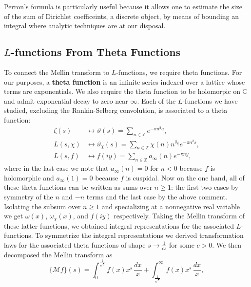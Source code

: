 \documentclass[12pt]{book}
\theoremstyle{definition}\newframedtheorem{method}{Method}
\newcommand{\mc}{\mathcal}
\newcommand{\Z}{\mathbb{Z}}
\newcommand{\C}{\mathbb{C}}
\renewcommand{\d}{\delta}
\newcommand{\z}{\zeta}
\newcommand{\w}{\omega}
\newcommand{\vt}{\vartheta}
\newcommand{\<}{\langle}
\renewcommand{\>}{\rangle}
\begin{document}
      Perron's formula is particularly useful because it allows one to estimate the size of the sum of Dirichlet coefficeints, a discrete object, by means of bounding an integral where analytic techniques are at our disposal.
    \subsection*{\texorpdfstring{$L$}{L}-functions From Theta Functions}
      To connect the Mellin transform to $L$-functions, we require theta functions. For our purposes, a \textbf{theta function} is an infinite series indexed over a lattice whose terms are exponentials. We also require the theta function to be holomorpic on $\C$ and admit exponential decay to zero near $\infty$. Each of the $L$-functions we have studied, excluding the Rankin-Selberg convolution, is associated to a theta function:
      \begin{align*}
        \z(s) &\longleftrightarrow \vt(s) = \sum_{n \in \Z}e^{-\pi n^{2}a}, \\
        L(s,\chi) &\longleftrightarrow \vt_{\chi}(s) = \sum_{n \in \Z}\chi(n)n^{\d_{\chi}}e^{-\pi n^{2}s}, \\
        L(s,f) &\longleftrightarrow f(iy) = \sum_{n \in \Z}a_{\infty}(n)e^{-\pi ny},
      \end{align*}
      where in the last case we note that $a_{\infty}(n) = 0$ for $n < 0$ because $f$ is holomorphic and $a_{\infty}(1) = 0$ because $f$ is cuspidal. Now on the one hand, all of these theta functions can be written as sums over $n \ge 1$: the first two cases by symmetry of the $n$ and $-n$ terms and the last case by the above comment. Isolating the subsum over $n \ge 1$ and specializing at a nonnegative real variable we get $\w(x)$, $\w_{\chi}(x)$, and $f(iy)$ respectively. Taking the Mellin transform of these latter functions, we obtained integral representations for the associated $L$-functions. To symmetrize the integral representations we derived transformation laws for the associated theta functions of shape $s \to \frac{1}{cs}$ for some $c > 0$. We then decomposed the Mellin transform as
      \[
        \{\mc{M}f\}(s) = \int_{0}^{\frac{1}{\sqrt{c}}}f(x)x^{s}\,\frac{dx}{x}+\int_{\frac{1}{\sqrt{c}}}^{\infty}f(x)x^{s}\,\frac{dx}{x},
      \]
\end{document}
